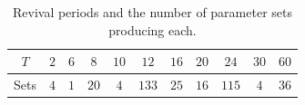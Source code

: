 \begin{table}[htbp]
\centering
\caption{Revival periods and the number of parameter sets producing each.}
\label{tab:period-count}
\begin{tabular}{ccccccccccc}
\toprule
$T$ & $2$ & $6$ & $8$ & $10$ & $12$ & $16$ & $20$ & $24$ & $30$ & $60$ \\
\midrule
Sets & $4$ & $1$ & $20$ & $4$ & $133$ & $25$ & $16$ & $115$ & $4$ & $36$ \\
\bottomrule
\end{tabular}
\end{table}
